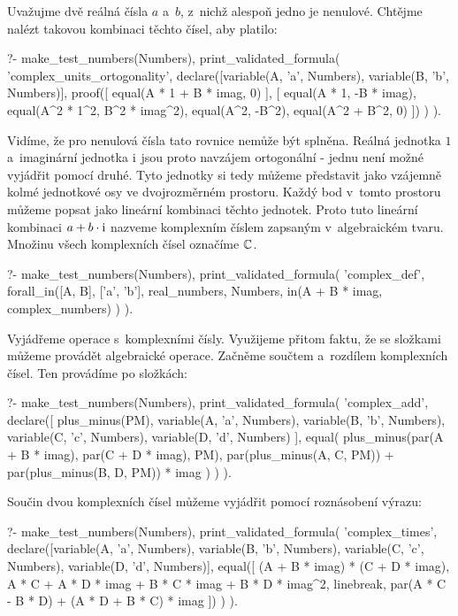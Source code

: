 Uvažujme dvě reálná čísla \(a\) a~\(b\), z~nichž alespoň jedno je nenulové. Chtějme nalézt takovou kombinaci těchto čísel, aby platilo:

\begin{prolog}
?-	make_test_numbers(Numbers),
	print_validated_formula(
		'complex_units_ortogonality',
		declare([variable(A, 'a', Numbers), variable(B, 'b', Numbers)],
			proof([
				equal(A * 1 + B * imag, 0)
			],
			[
				equal(A * 1, -B * imag),
				equal(A^2 * 1^2, B^2 * imag^2),
				equal(A^2, -B^2),
				equal(A^2 + B^2, 0)
			])
		)
	).
\end{prolog}

Vidíme, že pro nenulová čísla tato rovnice nemůže být splněna. Reálná jednotka \(1\) a~imaginární jednotka \(\mathrm{i}\) jsou proto navzájem ortogonální - jednu není možné vyjádřit pomocí druhé. Tyto jednotky si tedy můžeme představit jako vzájemně kolmé jednotkové osy ve dvojrozměrném prostoru. Každý bod v~tomto prostoru můžeme popsat jako lineární kombinaci těchto jednotek. Proto tuto lineární kombinaci \(a + b \cdot \mathrm{i}\) nazveme komplexním číslem zapsaným v~algebraickém tvaru. Množinu všech komplexních čísel označíme \(\mathbb{C}\).

\begin{fact}
\begin{prolog}
?-	make_test_numbers(Numbers),
	print_validated_formula(
		'complex_def',
		forall_in([A, B], ['a', 'b'], real_numbers, Numbers,
			in(A + B * imag, complex_numbers)
		)
	).
\end{prolog}
\end{fact}

Vyjádřeme operace s~komplexními čísly. Využijeme přitom faktu, že se složkami můžeme provádět algebraické operace. Začněme součtem a~rozdílem komplexních čísel. Ten provádíme po složkách:

\begin{prolog}
?-	make_test_numbers(Numbers),
	print_validated_formula(
		'complex_add',
		declare([
			plus_minus(PM), variable(A, 'a', Numbers), variable(B, 'b', Numbers),
			variable(C, 'c', Numbers), variable(D, 'd', Numbers)
		],
			equal(
				plus_minus(par(A + B * imag), par(C + D * imag), PM),
				par(plus_minus(A, C, PM)) + par(plus_minus(B, D, PM)) * imag
			)
		)
	).
\end{prolog}

Součin dvou komplexních čísel můžeme vyjádřit pomocí roznásobení výrazu:

\begin{prolog}
?-	make_test_numbers(Numbers),
	print_validated_formula(
		'complex_times',
		declare([variable(A, 'a', Numbers), variable(B, 'b', Numbers), variable(C, 'c', Numbers), variable(D, 'd', Numbers)],
			equal([
				(A + B * imag) * (C + D * imag),
				A * C + A * D * imag + B * C * imag + B * D * imag^2,
				linebreak,
				par(A * C - B * D) + (A * D  + B * C) * imag
			])
		)
	).
\end{prolog}

